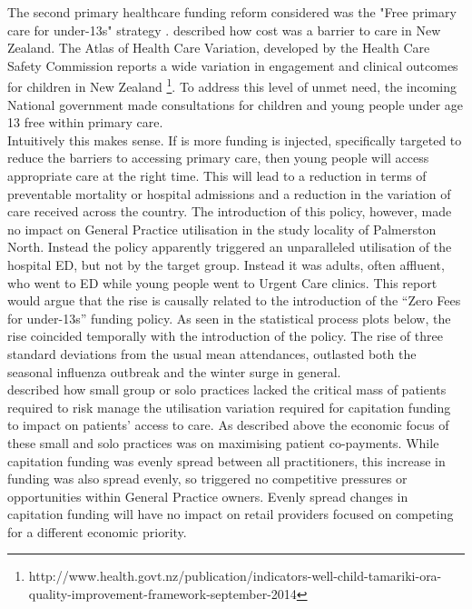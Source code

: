 \documentclass[11pt,a4paper]{article}
\begin{document}
The second primary healthcare funding reform considered was the "Free primary care for under-13s" strategy \citep{frizelle2014health}. \citet{schoen2009survey} described how cost was a barrier to care in New Zealand. The Atlas of Health Care Variation, developed by the Health Care Safety Commission reports a wide variation in engagement and clinical outcomes for children in New Zealand \footnote{http://www.health.govt.nz/publication/indicators-well-child-tamariki-ora-quality-improvement-framework-september-2014}. To address this level of unmet need, the incoming National government made consultations for children and young people under age 13 free within primary care\citep{frizelle2014health}. \\


Intuitively this makes sense. If is more funding is injected, specifically targeted to reduce the barriers to accessing primary care, then young people will access appropriate care at the right time. This will lead to a reduction in terms of preventable mortality or hospital admissions and a reduction in the variation of care received across the country. The introduction of this policy, however, made no impact on General Practice utilisation in the study locality of Palmerston North. Instead the policy apparently triggered an unparalleled utilisation of the hospital ED, but not by the target group. Instead it was adults, often affluent, who went to ED while young people went to Urgent Care clinics. This report would argue that the rise is causally related to the introduction of the “Zero Fees for under-13s” funding policy. As seen in the statistical process plots below, the rise coincided temporally with the introduction of the policy. The rise of three standard deviations from the usual mean attendances, outlasted both the seasonal influenza outbreak and the winter surge in general.\\


\citet{howell2005restructuring} described how small group or solo practices lacked the critical mass of patients required to risk manage the utilisation variation required for capitation funding to impact on patients’ access to care. As described above the economic focus of these small and solo practices was on maximising patient co-payments. While capitation funding was evenly spread between all practitioners, this increase in funding was also spread evenly, so triggered no competitive pressures or opportunities within General Practice owners. Evenly spread changes in capitation funding will have no impact on retail providers focused on competing for a different economic priority.\\
\end{document}
